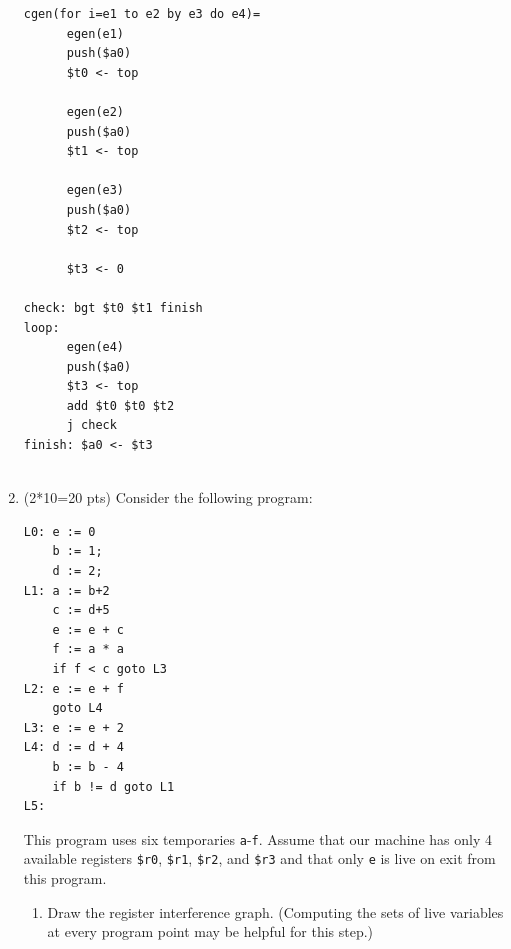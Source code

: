 \documentclass[10pt]{article}
\begin{document}
\begin{enumerate}
\begin{verbatim}
cgen(for i=e1 to e2 by e3 do e4)=
      egen(e1)
      push($a0)
      $t0 <- top

      egen(e2)
      push($a0)
      $t1 <- top

      egen(e3)
      push($a0)
      $t2 <- top

      $t3 <- 0

check: bgt $t0 $t1 finish
loop:
      egen(e4)
      push($a0)
      $t3 <- top
      add $t0 $t0 $t2
      j check
finish: $a0 <- $t3
    
\end{verbatim}



\item (2*10=20 pts) Consider the following program:

\begin{verbatim}
L0: e := 0
    b := 1;
    d := 2;
L1: a := b+2
    c := d+5
    e := e + c
    f := a * a
    if f < c goto L3
L2: e := e + f
    goto L4
L3: e := e + 2
L4: d := d + 4
    b := b - 4
    if b != d goto L1
L5:
\end{verbatim}

This program uses six temporaries \texttt{a}-\texttt{f}.  Assume that
our machine has only 4 available registers \texttt{\$r0},
\texttt{\$r1}, \texttt{\$r2}, and \texttt{\$r3}
and that only
\texttt{e} is live on exit from this program.

\begin{enumerate}
\item Draw the register interference graph.  (Computing the sets of
live variables at every program point may be helpful for this step.)


\end{enumerate}
\end{enumerate}
\end{document}

